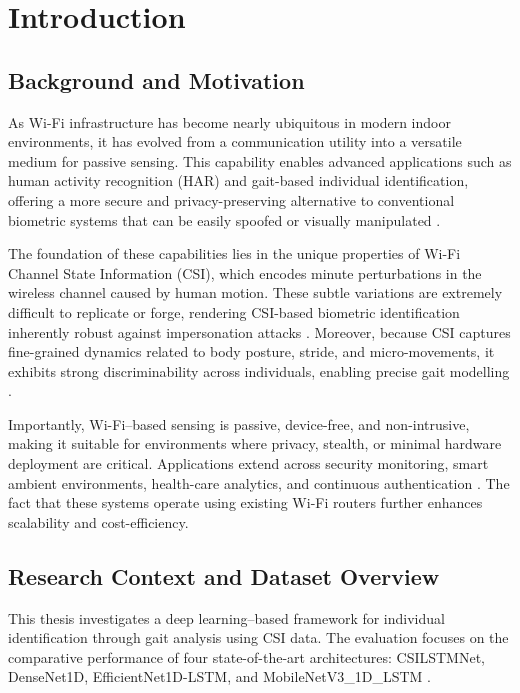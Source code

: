 
\section{Introduction}

\subsection{Background and Motivation}

As Wi-Fi infrastructure has become nearly ubiquitous in modern indoor environments, it has evolved from a communication utility into a versatile medium for passive sensing. This capability enables advanced applications such as human activity recognition (HAR) and gait-based individual identification, offering a more secure and privacy-preserving alternative to conventional biometric systems that can be easily spoofed or visually manipulated \parencite{shi2021wifi}. 

The foundation of these capabilities lies in the unique properties of Wi-Fi Channel State Information (CSI), which encodes minute perturbations in the wireless channel caused by human motion. These subtle variations are extremely difficult to replicate or forge, rendering CSI-based biometric identification inherently robust against impersonation attacks \parencite{alsheikh2024wifiid}. Moreover, because CSI captures fine-grained dynamics related to body posture, stride, and micro-movements, it exhibits strong discriminability across individuals, enabling precise gait modelling \parencite{zhang2020gaitid}. 

Importantly, Wi-Fi–based sensing is passive, device-free, and non-intrusive, making it suitable for environments where privacy, stealth, or minimal hardware deployment are critical. Applications extend across security monitoring, smart ambient environments, health-care analytics, and continuous authentication \parencite{lv2017wii}. The fact that these systems operate using existing Wi-Fi routers further enhances scalability and cost-efficiency.

\subsection{Research Context and Dataset Overview}

This thesis investigates a deep learning–based framework for individual identification through gait analysis using CSI data. The evaluation focuses on the comparative performance of four state-of-the-art architectures: CSILSTMNet, DenseNet1D, EfficientNet1D-LSTM, and MobileNetV3\_1D\_LSTM \parencite{deng2023sensefi}. 

